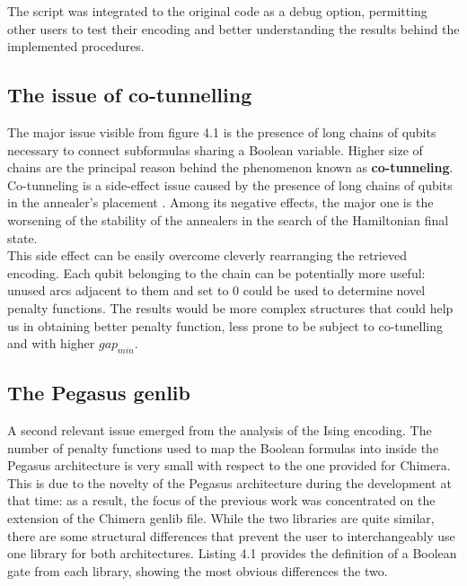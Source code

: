 The script was integrated to the original code as a debug option, permitting other users to test their encoding and better understanding the results behind the implemented procedures.

\subsection{The issue of co-tunnelling}

The major issue visible from figure 4.1 is the presence of long chains of qubits necessary to connect subformulas sharing a Boolean variable. Higher size of chains are the principal reason behind the phenomenon known as \textbf{co-tunneling}.  \\
 Co-tunneling is a side-effect issue caused by the presence of long chains of qubits in the annealer's placement \cite{cotunneling}. Among its negative effects, the major one is the worsening of the stability of the annealers in the search of the Hamiltonian final state. \\
 This side effect can be easily overcome cleverly rearranging the retrieved encoding. Each qubit belonging to the chain can be potentially more useful: unused arcs adjacent to them and set to 0 could be used to determine novel penalty functions. The results would be more complex structures that could help us in obtaining better penalty function, less prone to be subject to co-tunelling and with higher $gap_{min}$.
 
 \subsection{The Pegasus genlib}
 
 A second relevant issue emerged from the analysis of the Ising encoding. The number of penalty functions used to map the Boolean formulas into inside the Pegasus architecture is very small with respect to the one provided for Chimera. This is due to the novelty of the Pegasus architecture during the development at that time: as a result, the focus of the previous work was concentrated on the extension of the Chimera genlib file. While the two libraries are quite similar, there are some structural differences that prevent the user to interchangeably use one library for both architectures. Listing 4.1 provides the definition of a Boolean gate from each library, showing the most obvious differences the two. \\
 
